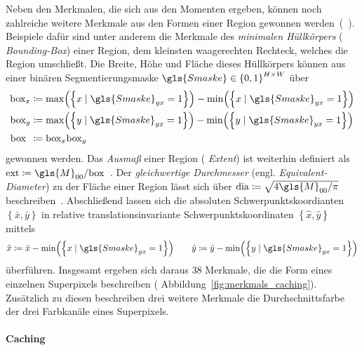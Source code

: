 Neben den Merkmalen, die sich aus den Momenten ergeben, können noch zahlreiche weitere Merkmale aus den Formen einer Region gewonnen werden~(\vgl{}~\cite{Siedhoff}).
Beispiele dafür sind unter anderem die Merkmale des \emph{minimalen Hüllkörpers} (\engl{} \emph{Bounding-Box}) einer Region, \dhe{} dem kleinsten waagerechten Rechteck, welches die Region umschließt.
Die Breite, Höhe und Fläche dieses Hüllkörpers können aus einer binären Segmentierungsmaske $\gls{Smaske} \in {\left\{0,1\right\}}^{H \times W}$ über
\begin{equation*}
\begin{split}
  \mathrm{box}_x & \coloneqq \max\left(\left\{x \mid \gls{Smaske}_{yx} = 1\right\}\right) - \min\left(\left\{x \mid \gls{Smaske}_{yx} = 1\right\}\right)\\
  \mathrm{box}_y & \coloneqq \max\left(\left\{y \mid \gls{Smaske}_{yx} = 1\right\}\right) - \min\left(\left\{y \mid \gls{Smaske}_{yx} = 1\right\}\right)\\
  \mathrm{box}_{\,\,\,} & \coloneqq \mathrm{box}_x \mathrm{box}_y
\end{split}
\end{equation*}
gewonnen werden.
Das \emph{Ausmaß} einer Region (\engl{} \emph{Extent}) ist weiterhin definiert als $\mathrm{ext} \coloneqq \gls{M}_{00}/\mathrm{box}$~\cite{scikit}.
Der \emph{gleichwertige Durchmesser} (engl. \emph{Equivalent-Di\-a\-me\-ter}) zu der Fläche einer Region lässt sich über $\mathrm{dia} \coloneqq \sqrt{4 \gls{M}_{00}/\pi}$ beschreiben~\cite{scikit, Siedhoff}.
Abschließend lassen sich die absoluten Schwerpunktskoordianten $\left\{\bar{x}, \bar{y}\right\}$ in relative \bzw{} translationsinvariante Schwerpunktskoordinaten $\left\{\hat{x}, \hat{y}\right\}$ mittels
\begin{equation*}
  \hat{x} \coloneqq \bar{x} - \min\left(\left\{x \mid \gls{Smaske}_{yx} = 1\right\}\right)
  \qquad
  \hat{y} \coloneqq \bar{y} - \min\left(\left\{y \mid \gls{Smaske}_{yx} = 1\right\}\right)
\end{equation*}
überführen.
Insgesamt ergeben sich daraus $38$ Merkmale, die die Form eines einzelnen Superpixels beschreiben (\vgl{} Abbildung~\ref{fig:merkmals_caching}).
Zusätzlich zu diesen beschreiben drei weitere Merkmale die Durchschnittsfarbe der drei Farbkanäle eines Superpixels.

\paragraph{Caching}
\label{Caching}


